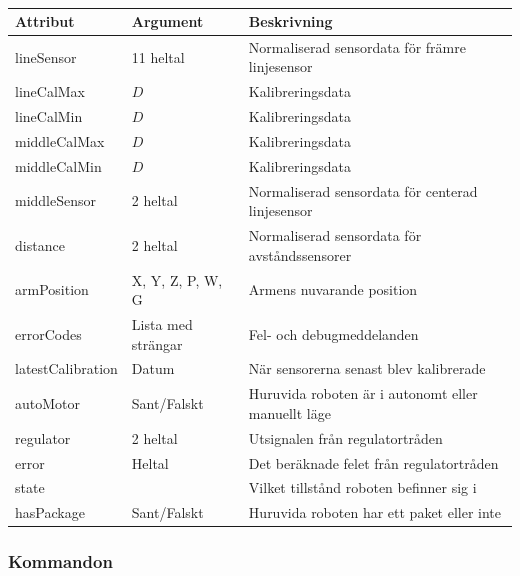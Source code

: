 \begin{table}[h!]
	\centering
	\begin{tabularx}{\textwidth}{| l | X | X |}
		\hline
		\textbf{Attribut} & \textbf{Argument} & {\textbf{Beskrivning}}\\\hline
		{lineSensor} & {11 heltal} & {Normaliserad sensordata för främre linjesensor} \\\hline
		{lineCalMax} & {$D$} & {Kalibreringsdata} \\\hline
		{lineCalMin} & {$D$} & {Kalibreringsdata} \\\hline
		{middleCalMax} & {$D$} & {Kalibreringsdata} \\\hline
		{middleCalMin} & {$D$} & {Kalibreringsdata} \\\hline
		{middleSensor} & {2 heltal} & {Normaliserad sensordata för centerad linjesensor} \\\hline
		{distance} & {2 heltal} & {Normaliserad sensordata för avståndssensorer} \\\hline
		{armPosition} & {X, Y, Z, P, W, G} & {Armens nuvarande position} \\\hline
		{errorCodes} & {Lista med strängar} & {Fel- och debugmeddelanden} \\\hline
		{latestCalibration} & {Datum} & {När sensorerna senast blev kalibrerade} \\\hline
		{autoMotor} & {Sant/Falskt} & {Huruvida roboten är i autonomt eller manuellt läge} \\\hline
		{regulator} & {2 heltal} & {Utsignalen från regulatortråden} \\\hline
		{error} & {Heltal} & {Det beräknade felet från regulatortråden} \\\hline
		{state} & {} & {Vilket tillstånd roboten befinner sig i} \\\hline
		{hasPackage} & {Sant/Falskt} & {Huruvida roboten har ett paket eller inte} \\\hline
	\end{tabularx}
	\caption{} \label{kommunikation-pc-huvud-status}
\end{table}

\subsubsection{Kommandon}

